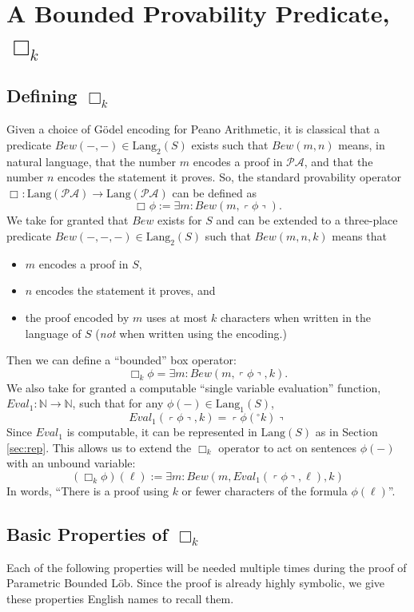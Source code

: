 \documentclass[onecolumn,authordate]{miri-tech-article}
\numberwithin{equation}{section}
\theoremstyle{definition}
\newcommand{\NN}{\mathbb{N}}
\newcommand{\bx}[1]{\Box_{#1}}
\newcommand{\PA}{\mathcal{P}\!\mathcal{A}}
\newcommand{\Lang}{\mathrm{Lang}}
\renewcommand{\to}{\rightarrow}
\newcommand{\qquote}[1]{\left\ulcorner #1 \right\urcorner}
\newcommand{\numeral}{{}^\circ}
\renewcommand{\-}{^{-1}}
\begin{document}
\section{A Bounded Provability Predicate, \texorpdfstring{$\bx{k}$}{box k}}
\subsection{Defining \texorpdfstring{$\bx{k}$}{box k}}
Given a choice of G\"{o}del encoding for Peano Arithmetic, it is classical that a predicate $Bew(-,-) \in \Lang_2(S)$ exists such that $Bew(m,n)$ means, in natural language, that the number $m$ encodes a proof in $\PA$, and that the number $n$ encodes the statement it proves.  So, the standard provability operator $\bx{}:\Lang(\PA)\to\Lang(\PA)$ can be defined as
$$\bx{}\phi := \exists m : Bew(m,\qquote\phi).$$
We take for granted that $Bew$ exists for $S$ and can be extended to a three-place predicate $Bew(-,-,-) \in \Lang_2(S)$ such that $Bew(m,n,k)$ means that 

\begin{itemize}
\item $m$ encodes a proof in $S$,
\item $n$ encodes the statement it proves, and
\item the proof encoded by $m$ uses at most $k$ characters when written in the language of $S$ ({\em not} when written using the encoding.)
\end{itemize}
%
Then we can define a ``bounded'' box operator:
$$\bx{k}\phi = \exists m : Bew(m,\qquote{\phi},k).$$
We also take for granted a computable ``single variable evaluation'' function, $Eval_1:\NN\to\NN$, such that for any $\phi(-)\in\Lang_1(S)$, 
$$Eval_1(\qquote\phi,k) = \qquote{\phi(\numeral k)}$$
Since $Eval_1$ is computable, it can be represented in $\Lang(S)$ as in Section \ref{sec:rep}.  
This allows us to extend the $\bx{k}$ operator to act on sentences $\phi(-)$ with an unbound variable:
%
$$(\bx{k}\phi)(\ell) := \exists m : Bew(m,Eval_1(\qquote\phi,\ell),k)$$
%
In words, ``There is a proof using $k$ or fewer characters of the formula $\phi(\ell)$''.

\subsection{Basic Properties of \texorpdfstring{$\bx{k}$}{box k}}
Each of the following properties will be needed multiple times during the proof of Parametric Bounded L\"{o}b.  Since the proof is already highly symbolic, we give these properties English names to recall them. 
\end{document}
